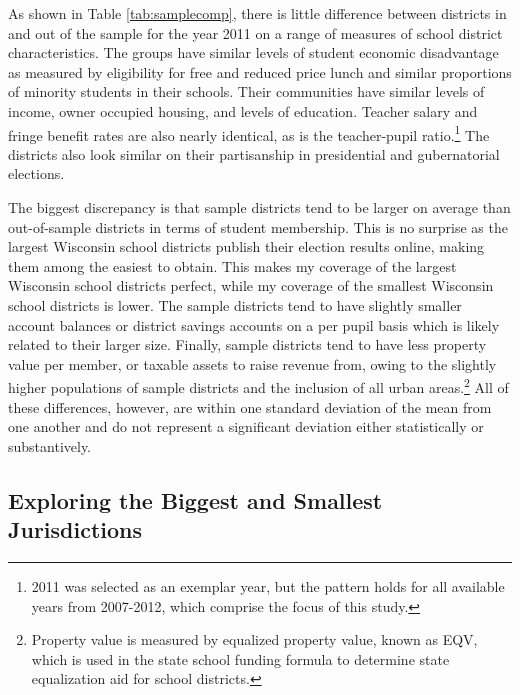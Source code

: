 
As shown in Table \ref{tab:samplecomp}, there is little difference between districts 
in and out of the sample for the year 2011 on a range of measures of school district 
characteristics. The groups have similar levels of student 
economic disadvantage as measured by eligibility for free and reduced price lunch and 
similar proportions of minority students in their schools. 
Their communities have similar levels of income, owner occupied housing, and levels 
of education. Teacher salary and fringe benefit rates are also nearly identical, as 
is the teacher-pupil ratio.\footnote{2011 was selected as an exemplar year, but 
the pattern holds for all available years from 2007-2012, which comprise the focus 
of this study.} The districts also look similar on their partisanship in presidential 
and gubernatorial elections.

The biggest discrepancy is that sample districts tend to be larger on average than 
out-of-sample districts in terms of student membership. This is no surprise as the largest 
Wisconsin school districts publish their election results online, making them among 
the easiest to obtain. This makes my coverage of the largest Wisconsin school 
districts perfect, while my coverage of the smallest Wisconsin school districts 
is lower. The sample districts tend to have slightly smaller account balances or 
district savings accounts on a per pupil basis which is likely related to their larger size. 
Finally, sample districts tend to have less property value per member, or taxable 
assets to raise revenue from, owing to the slightly higher populations of sample 
districts and the inclusion of all urban areas.\footnote{Property value is measured 
by equalized property value, known as EQV, which is used in the state school funding 
formula to determine state equalization aid for school districts.} All of these differences, however, 
are within one standard deviation of the mean from one another and do not represent 
a significant deviation either statistically or substantively. 

\subsection{Exploring the Biggest and Smallest Jurisdictions}

